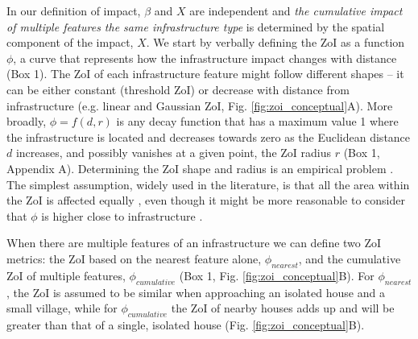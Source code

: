 \documentclass[titlepage]{article}
\begin{document}
In our definition of impact, $\beta$ and $X$ are independent and \textit{the cumulative impact of multiple features the same infrastructure type} is determined by the spatial component of the impact, $X$. We start by verbally defining the ZoI as a function $\phi$, a curve that represents how the infrastructure impact changes with distance (Box 1). The ZoI of each infrastructure feature might follow different shapes -- it can be either constant (threshold ZoI) or decrease with distance from infrastructure (e.g. linear and Gaussian ZoI, Fig. \ref{fig:zoi_conceptual}A). More broadly, $\phi = f(d, r)$ is any decay function that has a maximum value 1 where the infrastructure is located and decreases towards zero as the Euclidean distance $d$ increases, and possibly vanishes at a given point, the ZoI radius $r$ (Box 1, Appendix A). Determining the ZoI shape and radius is an empirical problem \citep{miguet_how_2017}. The simplest assumption, widely used in the literature, is that all the area within the ZoI is affected equally \citep[a buffer zone around features; e.g][]{quinonezpinon_design_2007}, even though it might be more reasonable to consider that $\phi$ is higher close to infrastructure \citep[][]{skarin_out_2018, zeller_multi-level_2017}. 

When there are multiple features of an infrastructure we can define two ZoI metrics: the ZoI based on the nearest feature alone, $\phi_{nearest}$, and the cumulative ZoI of multiple features, $\phi_{cumulative}$ (Box 1, Fig. \ref{fig:zoi_conceptual}B). For $\phi_{nearest}$, the ZoI is assumed to be similar when approaching an isolated house and a small village, while for $\phi_{cumulative}$ the ZoI of nearby houses adds up and will be greater than that of a single, isolated house (Fig. \ref{fig:zoi_conceptual}B).
\end{document}
